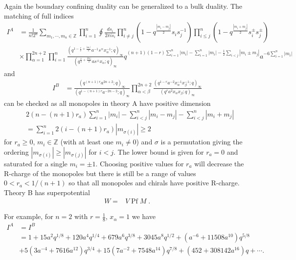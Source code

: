 \documentclass[12pt]{article}
\newcommand{\Zb}{\mathbb{Z}}
\newcommand{\Pf}{\operatorname{Pf}}
\numberwithin{equation}{section}
\begin{document}
Again the boundary confining duality can be generalized to a bulk duality. The matching of full indices 
\begin{align}
I^A&=\frac{1}{n!2^n}
\sum_{m_1,\cdots,m_n\in \mathbb{Z}}
\prod_{i=1}^n
\oint \frac{ds_i}{2\pi i s_i}
\prod_{i\neq j}^n (1-q^{\frac{|m_i-m_j|}{2}}s_i s_j^{-1})
\prod_{i\le j}^{n} (1-q^{\frac{|m_i+m_j|}{2}}s_i^{\pm} s_j^{\pm})
\nonumber\\
&\times 
\prod_{\alpha=1}^{2n+2}
\prod_{i=1}^{n}
\frac{(q^{1-\frac{r}{2}+\frac{|m_i|}{2}} a^{-1} s^{\mp} x_{\alpha}^{-1};q )_{\infty}}
{(q^{\frac{r}{2}+\frac{|m_i|}{2}}as^{\pm}x_{\alpha};q)_{\infty}}
q^{(n+1)(1-r)\sum_{i=1}^n |m_i|-\sum_{i=1}^n |m_i|-\frac12\sum_{i<j}|m_i\pm m_j|}
a^{-6\sum_{i=1}^n|m_i| }
\end{align}
and
\begin{align}
I^B&=\frac{
(q^{(n+1)r} a^{2n+2};q)_{\infty}
}{
(q^{1-(n+1)r} a^{-2n-2};q)_{\infty}
}
\prod_{\alpha<\beta}^{2n+2}
\frac{
(q^{1-r} a^{-2}x_{\alpha}^{-1}x_{\beta}^{-1};q)_{\infty}
}{
(q^{r} a^{2} x_{\alpha}x_{\beta};q)_{\infty}
}
\end{align}
can be checked as all monopoles in theory A have positive dimension
\begin{align}
\label{Mono_Ch_usp2n_2np2}
    &2(n - (n+1)r_a) \sum_{i=1}^n |m_i| - \sum_{i < j}^n |m_i - m_j| - \sum_{i < j}^n |m_i + m_j| 
    \nonumber\\
    &= \sum_{i=1}^n 2\left( i - (n+1)r_a \right) |m_{\sigma(i)}| \ge 2
\end{align}
for $r_a \ge 0$, $m_i \in \Zb$ (with at least one $m_i \ne 0$) and $\sigma$ is a permutation giving the ordering $|m_{\sigma(i)}| \ge |m_{\sigma(j)}|$ for $i < j$. The lower bound is given for $r_a = 0$ and saturated for a single $m_i = \pm 1$. Choosing positive values for $r_a$ will decrease the R-charge of the monopoles but there is still be a range of values $0 < r_a < 1/(n+1)$ so that all monopoles and chirals have positive R-charge.
Theory B has superpotential \cite{Karch:1997ux}
\begin{align}
    W = & V \Pf M \; .
\end{align}

For example, for $n=2$ with $r=\frac18$, $x_{\alpha}=1$ we have 
\begin{align}
I^A&=I^B
\nonumber\\
&=1+15a^2q^{1/8}+120a^4q^{1/4}+679a^6q^{3/8}
+3045a^8q^{1/2}+(a^{-6}+11508a^{10})q^{5/8}
\nonumber\\
&+5(3a^{-4}+7616a^{12})q^{3/4}
+15(7a^{-2}+7548a^{14})q^{7/8}
+(452+308142a^{16})q+\cdots.
\end{align}
\end{document}
